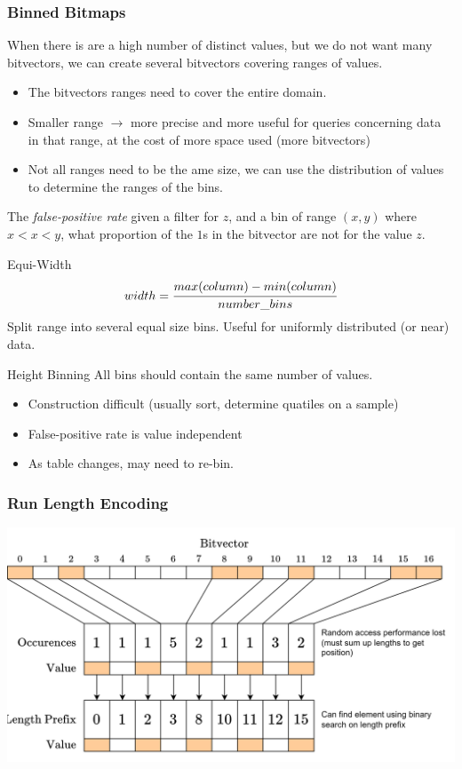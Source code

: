 \subsubsection{Binned Bitmaps}
When there is are a high number of distinct values, but we do not want many bitvectors, we can create several bitvectors covering ranges of values.
\begin{itemize}
    \item The bitvectors ranges need to cover the entire domain.
    \item Smaller range $\to$ more precise and more useful for queries concerning data in that range, at the cost of more space used (more bitvectors)
    \item Not all ranges need to be the ame size, we can use the distribution of values to determine the ranges of the bins.
\end{itemize}
The \textit{false-positive rate} given a filter for $z$, and a bin of range $(x,y)$ where $x < x < y$, what proportion of the $1$s in the bitvector are not for the value $z$.
\begin{tcbraster}[raster columns=2, raster equal height]
    \begin{definitionbox}{Equi-Width}
        \[width = \cfrac{max(column) - min(column)}{number\_bins}\]
        Split range into several equal size bins. Useful for uniformly distributed (or near) data.
    \end{definitionbox}
    \begin{definitionbox}{Height Binning}
        All bins should contain the same number of values.
        \begin{itemize}
            \item Construction difficult (usually sort, determine quatiles on a sample)
            \item False-positive rate is value independent
            \item As table changes, may need to re-bin.
        \end{itemize}
    \end{definitionbox}
\end{tcbraster}

\subsubsection{Run Length Encoding}
\begin{center}
    \includegraphics[width=.8\textwidth]{algorithms_and_indices/images/rle.drawio.png}
\end{center}


